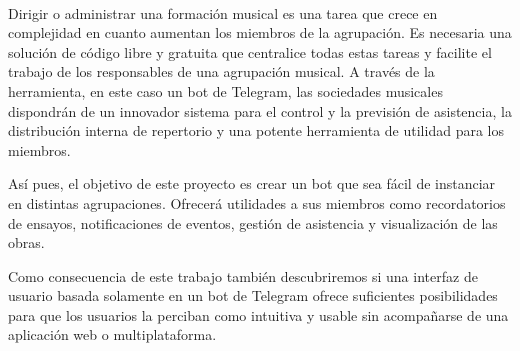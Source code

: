 \chapter*{}






\cleardoublepage
\thispagestyle{empty}

\begin{center}
{\large\bfseries \myTitle}\\
\end{center}
\begin{center}
\myName\\
\end{center}

\\

\vspace{0.7cm}
\\


Dirigir o administrar una formación musical es una tarea que crece en complejidad en cuanto aumentan los miembros de la agrupación. Es necesaria una solución de código libre y gratuita que centralice todas estas tareas y facilite el trabajo de los responsables de una agrupación musical. A través de la herramienta, en este caso un bot de Telegram, las sociedades musicales dispondrán de un innovador sistema para el control y la previsión de asistencia, la distribución interna de repertorio y una potente herramienta de utilidad para los miembros.

Así pues, el objetivo de este proyecto es crear un bot que sea fácil de instanciar en distintas agrupaciones. Ofrecerá utilidades a sus miembros como recordatorios de ensayos, notificaciones de eventos, gestión de asistencia y visualización de las obras.

Como consecuencia de este trabajo también descubriremos si una interfaz de usuario basada solamente en un bot de Telegram ofrece suficientes posibilidades para que los usuarios la perciban como intuitiva y usable sin acompañarse de una aplicación web o multiplataforma.


